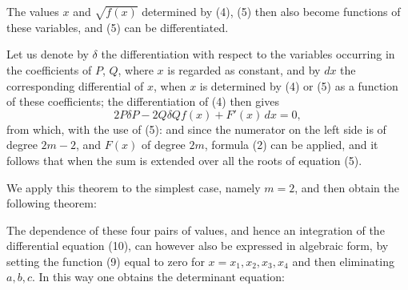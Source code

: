 
The values $x$ and $\sqrt{f(x)}$ determined by (4), (5) then also
become functions of these variables, and (5) can be
differentiated.

Let us denote by $\delta$ the differentiation with respect to the
variables occurring in the coefficients of $P$, $Q$, where $x$
is regarded as constant, and by $dx$ the corresponding differential of $x$,
when $x$ is determined by (4) or (5) as a function of these
coefficients; the differentiation of (4) then gives
\[ 2P\delta P - 2Q\delta Qf(x) + F'(x)\,dx = 0, \]
from which, with the use of (5):
and since the numerator on the left side is of degree $2m-2$,
and $F(x)$ of degree $2m$, formula (2) can be applied,
and it follows that
when the sum is extended over all the roots of equation
 (5).

We apply this theorem to the simplest case, namely
 $m=2$, and then obtain the following theorem:


The dependence of these four pairs of values, and hence an integration
 of the differential equation (10), can however also be expressed
 in algebraic form, by setting the function
(9) equal to zero for $x = x_1, x_2, x_3, x_4$ and then eliminating
$a, b, c$. In this way one obtains the determinant equation:
